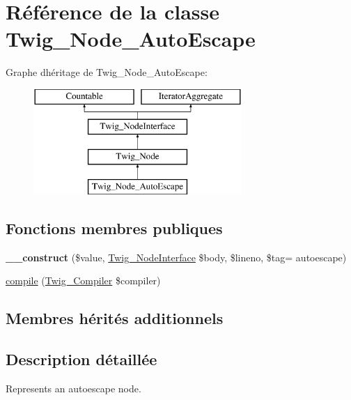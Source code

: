 \hypertarget{class_twig___node___auto_escape}{}\section{Référence de la classe Twig\+\_\+\+Node\+\_\+\+Auto\+Escape}
\label{class_twig___node___auto_escape}
Graphe d\textquotesingle{}héritage de Twig\+\_\+\+Node\+\_\+\+Auto\+Escape\+:\begin{figure}[H]
\begin{center}
\leavevmode
\includegraphics[height=4.000000cm]{class_twig___node___auto_escape}
\end{center}
\end{figure}
\subsection*{Fonctions membres publiques}
\begin{DoxyCompactItemize}
\item 
{\bfseries \+\_\+\+\_\+construct} (\$value, \hyperlink{interface_twig___node_interface}{Twig\+\_\+\+Node\+Interface} \$body, \$lineno, \$tag= \textquotesingle{}autoescape\textquotesingle{})\hypertarget{class_twig___node___auto_escape_a936cacf2b37c2b84fa04b39621f499ec}{}\label{class_twig___node___auto_escape_a936cacf2b37c2b84fa04b39621f499ec}

\item 
\hyperlink{class_twig___node___auto_escape_a4e0faa87c3fae583620b84d3607085da}{compile} (\hyperlink{class_twig___compiler}{Twig\+\_\+\+Compiler} \$compiler)
\end{DoxyCompactItemize}
\subsection*{Membres hérités additionnels}


\subsection{Description détaillée}
Represents an autoescape node.

